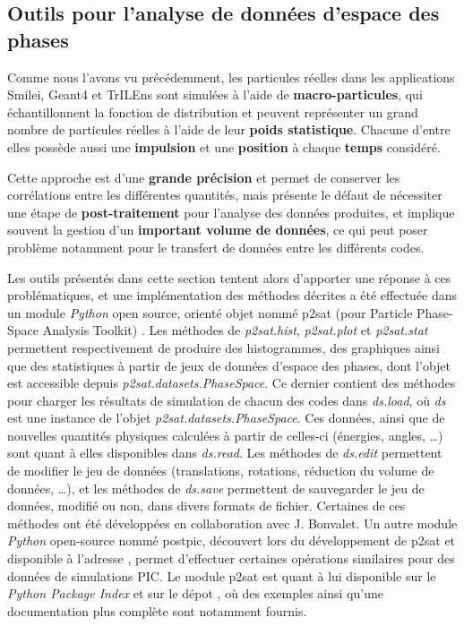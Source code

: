 \begin{refsection}
\section{Outils pour l'analyse de données d'espace des phases}

Comme nous l'avons vu précédemment, les particules réelles dans les applications Smilei, Geant4 et TrILEns sont simulées à l'aide de \textbf{macro-particules}, qui échantillonnent la fonction de distribution et peuvent représenter un grand nombre de particules réelles à l'aide de leur \textbf{poids statistique}. Chacune d'entre elles possède aussi une \textbf{impulsion} et une \textbf{position} à chaque \textbf{temps} considéré.

Cette approche est d'une \textbf{grande précision} et permet de conserver les corrélations entre les différentes quantités, mais présente le défaut de nécessiter une étape de \textbf{post-traitement} pour l'analyse des données produites, et implique souvent la gestion d'un \textbf{important volume de données}, ce qui peut poser problème notamment pour le transfert de données entre les différents codes.

Les outils présentés dans cette section tentent alors d'apporter une réponse à ces problématiques, et une implémentation des méthodes décrites a été effectuée dans un module \textit{Python} open source, orienté objet nommé p2sat (pour Particle Phase-Space Analysis Toolkit) \parencite{p2sat}. 
Les méthodes de \textit{p2sat.hist}, \textit{p2sat.plot} et \textit{p2sat.stat} permettent respectivement de produire des histogrammes, des graphiques ainsi que des statistiques à partir de jeux de données d'espace des phases, dont l'objet est accessible depuis \textit{p2sat.datasets.PhaseSpace}. Ce dernier contient des méthodes pour charger les résultats de simulation de chacun des codes dans \textit{ds.load}, où \textit{ds} est une instance de l'objet \textit{p2sat.datasets.PhaseSpace}. Ces données, ainsi que de nouvelles quantités physiques calculées à partir de celles-ci (énergies, angles, …) sont quant à elles disponibles dans \textit{ds.read}. Les méthodes de \textit{ds.edit} permettent de modifier le jeu de données (translations, rotations, réduction du volume de données, …), et les méthodes de \textit{ds.save} permettent de sauvegarder le jeu de données, modifié ou non, dans divers formats de fichier. 
Certaines de ces méthodes ont été développées en collaboration avec J. Bonvalet. Un autre module \textit{Python} open-source nommé postpic, découvert lors du développement de p2sat et disponible à l'adresse \parencite{postpic}, permet d'effectuer certaines opérations similaires pour des données de simulations PIC. Le module p2sat est quant à lui disponible sur le \textit{Python Package Index} et sur le dépot \parencite{p2sat}, où des exemples ainsi qu'une documentation plus complète sont notamment fournis.


\end{refsection}
